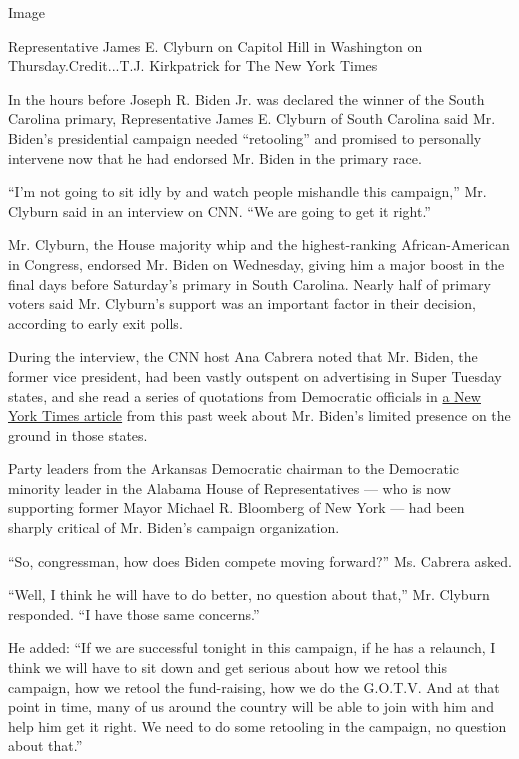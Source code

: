 Image

Representative James E. Clyburn on Capitol Hill in Washington on
Thursday.Credit...T.J. Kirkpatrick for The New York Times

In the hours before Joseph R. Biden Jr. was declared the winner of the
South Carolina primary, Representative James E. Clyburn of South
Carolina said Mr. Biden's presidential campaign needed ``retooling'' and
promised to personally intervene now that he had endorsed Mr. Biden in
the primary race.

``I'm not going to sit idly by and watch people mishandle this
campaign,'' Mr. Clyburn said in an interview on CNN. ``We are going to
get it right.''

Mr. Clyburn, the House majority whip and the highest-ranking
African-American in Congress, endorsed Mr. Biden on Wednesday, giving
him a major boost in the final days before Saturday's primary in South
Carolina. Nearly half of primary voters said Mr. Clyburn's support was
an important factor in their decision, according to early exit polls.

During the interview, the CNN host Ana Cabrera noted that Mr. Biden, the
former vice president, had been vastly outspent on advertising in Super
Tuesday states, and she read a series of quotations from Democratic
officials in
\href{https://www.nytimes3xbfgragh.onion/2020/02/26/us/politics/joe-biden-california-super-tuesday.html}{a
New York Times article} from this past week about Mr. Biden's limited
presence on the ground in those states.

Party leaders from the Arkansas Democratic chairman to the Democratic
minority leader in the Alabama House of Representatives --- who is now
supporting former Mayor Michael R. Bloomberg of New York --- had been
sharply critical of Mr. Biden's campaign organization.

``So, congressman, how does Biden compete moving forward?'' Ms. Cabrera
asked.

``Well, I think he will have to do better, no question about that,'' Mr.
Clyburn responded. ``I have those same concerns.''

He added: ``If we are successful tonight in this campaign, if he has a
relaunch, I think we will have to sit down and get serious about how we
retool this campaign, how we retool the fund-raising, how we do the
G.O.T.V. And at that point in time, many of us around the country will
be able to join with him and help him get it right. We need to do some
retooling in the campaign, no question about that.''

